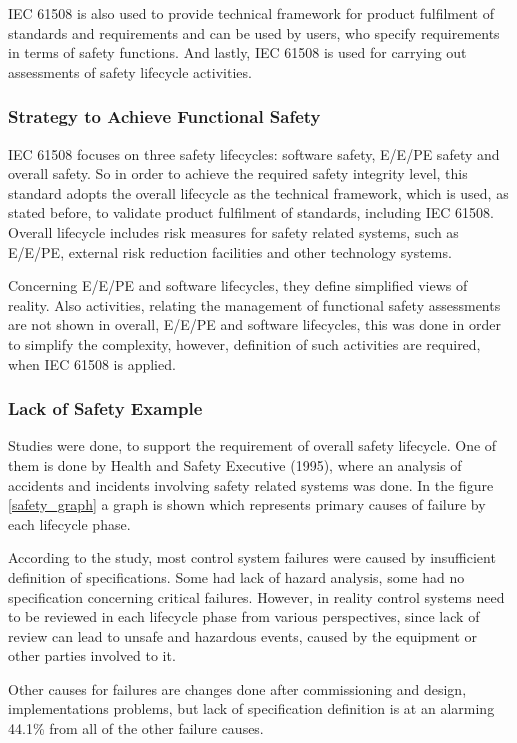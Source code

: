 \documentclass[conference]{IEEEtran}
\begin{document}
IEC 61508 is also used to provide technical framework for product fulfilment of standards and requirements and can be used by users, who specify requirements in terms of safety functions. And lastly, IEC 61508 is used for carrying out assessments of safety lifecycle activities.

\subsubsection{Strategy to Achieve Functional Safety}

IEC 61508 focuses on three safety lifecycles: software safety, E/E/PE safety and overall safety. So in order to achieve the required safety integrity level, this standard adopts the overall lifecycle as the technical framework, which is used, as stated before, to validate product fulfilment of standards, including IEC 61508. Overall lifecycle includes risk measures for safety related systems, such as E/E/PE, external risk reduction facilities and other technology systems.

Concerning E/E/PE and software lifecycles, they define simplified views of reality. Also activities, relating the management of functional safety assessments are not shown in overall, E/E/PE and software lifecycles, this was done in order to simplify the complexity, however, definition of such activities are required, when IEC 61508 is applied.

\subsubsection{Lack of Safety Example}

Studies were done, to support the requirement of overall safety lifecycle. One of them is done by Health and Safety Executive (1995), where an analysis of accidents and incidents involving safety related systems was done. In the figure \ref{safety_graph} a graph is shown which represents primary causes of failure by each lifecycle phase.

According to the study, most control system failures were caused by insufficient definition of specifications. Some had lack of hazard analysis, some had no specification concerning critical failures. However, in reality control systems need to be reviewed in each lifecycle phase from various perspectives, since lack of review can lead to unsafe and hazardous events, caused by the equipment or other parties involved to it.

Other causes for failures are changes done after commissioning and design, implementations problems, but lack of specification definition is at an alarming 44.1\% from all of the other failure causes.
\end{document}
